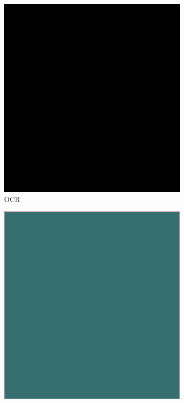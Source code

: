 \documentclass[aspectratio=1610]{beamer}
\begin{document}
\begin{frame}
  \begin{figure}
\centering
\begin{subfigure}{.25\textwidth}
  \centering
  \includegraphics[width=0.99\linewidth, clip=true, trim = 0mm 0mm 0mm 0mm]{figures/ocr/1RoKim0.jpg}
  \caption{OCR}
\end{subfigure}%
\begin{subfigure}{.25\textwidth}
  \centering
  \includegraphics[width=0.99\linewidth, clip=true, trim = 0mm 0mm 0mm 0mm]{figures/ocr_bbox/1RoKim0.jpg}

\end{subfigure}
\end{figure}
\end{frame}
\end{document}

